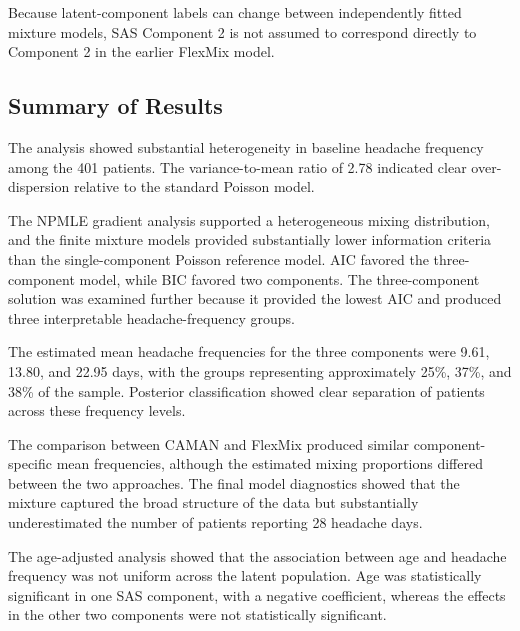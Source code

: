 Because latent-component labels can change between independently
fitted mixture models, SAS Component 2 is not assumed to correspond
directly to Component 2 in the earlier FlexMix model.

\subsection{Summary of Results}

The analysis showed substantial heterogeneity in baseline headache
frequency among the 401 patients. The variance-to-mean ratio of 2.78
indicated clear over-dispersion relative to the standard Poisson
model.

The NPMLE gradient analysis supported a heterogeneous mixing
distribution, and the finite mixture models provided substantially
lower information criteria than the single-component Poisson
reference model. AIC favored the three-component model, while BIC
favored two components. The three-component solution was examined
further because it provided the lowest AIC and produced three
interpretable headache-frequency groups.

The estimated mean headache frequencies for the three components
were 9.61, 13.80, and 22.95 days, with the groups representing
approximately 25\%, 37\%, and 38\% of the sample. Posterior
classification showed clear separation of patients across these
frequency levels.

The comparison between CAMAN and FlexMix produced similar
component-specific mean frequencies, although the estimated mixing
proportions differed between the two approaches. The final model
diagnostics showed that the mixture captured the broad structure of
the data but substantially underestimated the number of patients
reporting 28 headache days.

The age-adjusted analysis showed that the association between age and
headache frequency was not uniform across the latent population. Age
was statistically significant in one SAS component, with a negative
coefficient, whereas the effects in the other two components were
not statistically significant.
